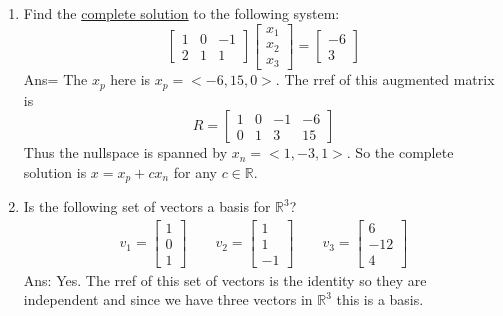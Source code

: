 \documentclass[10pt, a4paper]{article}
\theoremstyle{break}
\begin{document}
\begin{enumerate}
\item Find the \underline{complete solution} to the following system:
$$
\begin{bmatrix}
1 & 0 & -1 \\
2 & 1 & 1
\end{bmatrix}
\begin{bmatrix}
x_1 \\
x_2 \\
x_3
\end{bmatrix}
=
\begin{bmatrix}
-6 \\
3
\end{bmatrix} 
$$
Ans= The $x_p$ here is $x_p=<-6,15,0>$. The rref of this augmented matrix is 
\begin{equation}
R=
\begin{bmatrix}
1&0&-1&-6\\
0&1&3&15
\end{bmatrix}
\end{equation}
Thus the nullspace is spanned by $x_n=<1,-3,1>$. So the complete solution is $x=x_p+c x_n$ for any $c \in \mathbb{R}$. 
\item Is the following set of vectors a basis for $\mathbb{R}^3$?
\begin{align}
v_1=\begin{bmatrix} 1 \\ 0 \\1 \end{bmatrix} \qquad v_2=\begin{bmatrix} 1 \\ 1 \\ -1 \end{bmatrix} \qquad v_3=\begin{bmatrix} 6 \\ -12\\ 4 \end{bmatrix}
\end{align}
Ans: Yes. The rref of this set of vectors is the identity so they are independent and since we have three vectors in $\mathbb{R}^3$ this is a basis. 

\end{enumerate}
\end{document}
